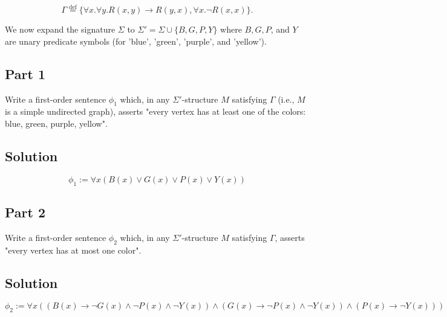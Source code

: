 \documentclass{article}
\begin{document}
\[
\Gamma \stackrel{\text{def}}{=} \{\forall x.\forall y. R(x, y) \rightarrow R(y, x), \forall x. \neg R(x, x)\}.
\]

\vspace{1em}
We now expand the signature $\Sigma$ to $\Sigma' = \Sigma \cup \{B, G, P, Y\}$ where $B, G, P$, and $Y$ are unary predicate symbols (for 'blue', 'green', 'purple', and 'yellow').


\subsection*{Part 1}

\vspace{1em}
\begin{mdframed}
Write a first-order sentence $\phi_1$ which, in any $\Sigma'$-structure $M$ satisfying $\Gamma$ (i.e., $M$ is a simple undirected graph),
 asserts "every vertex has at least one of the colors: blue, green, purple, yellow".
\end{mdframed}


\subsection*{Solution}

\[
\phi_1 := \forall x (B(x) \lor G(x) \lor P(x) \lor Y(x))
\]

\newpage



\subsection*{Part 2}

\vspace{1em}
\begin{mdframed}
    Write a first-order sentence $\phi_2$ which, in any $\Sigma'$-structure $M$ satisfying $\Gamma$, 
    asserts "every vertex has at most one color".
\end{mdframed}


\subsection*{Solution}

\[
\phi_2 := \forall x ((B(x) \rightarrow \neg G(x) \land \neg P(x) \land \neg Y(x)) \land (G(x) \rightarrow \neg P(x) \land \neg Y(x)) \land (P(x) \rightarrow \neg Y(x)))
\]

\newpage
\end{document}
